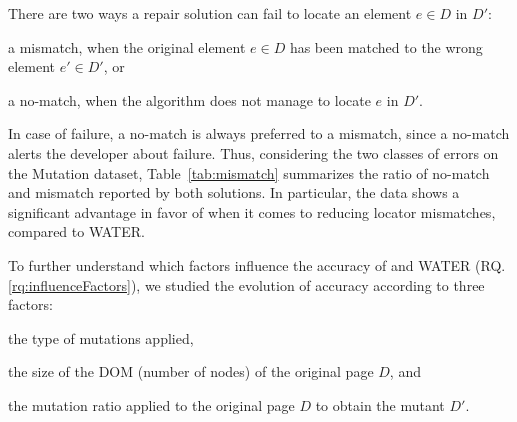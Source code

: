 \documentclass[preprint, 12pt]{elsarticle}
\begin{document}
There are two ways a repair solution can fail to locate an element $e \in D$ in $D'$: 
\begin{inparaenum}
    \item a \textsf{mismatch}, when the original element $e \in D$ has been matched to the wrong element $e' \in D'$, or
    \item a \textsf{no-match}, when the algorithm does not manage to locate $e$ in $D'$. 
\end{inparaenum}
In case of failure, a \textsf{no-match} is always preferred to a \textsf{mismatch}, since a \textsf{no-match} alerts the developer about failure.
Thus, considering the two classes of errors on the {\sc Mutation} dataset, Table~\ref{tab:mismatch} summarizes the ratio of \textsf{no-match} and \textsf{mismatch} reported by both solutions.
In particular, the data shows a significant advantage in favor of \erratum when it comes to reducing locator mismatches, compared to WATER.

\begin{table}[H]
    \caption{Errors distribution of \erratum{} and WATER on the \textsc{Mutation} dataset.}\label{tab:mismatch}
    \centering
\end{table}

To further understand which factors influence the accuracy of \erratum and WATER (RQ.\ref{rq:influenceFactors}), we studied the evolution of accuracy according to three factors:
\begin{inparaenum}
    \item the type of mutations applied,
    \item the size of the DOM (number of nodes) of the original page $D$, and
    \item the mutation ratio applied to the original page $D$ to obtain the mutant $D'$.
\end{inparaenum}
\end{document}
